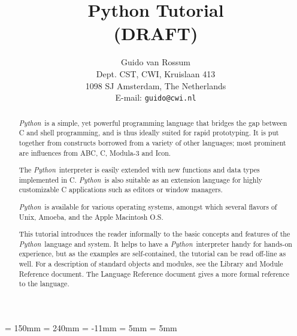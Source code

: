 

\textwidth =      150mm
\textheight =     240mm
\topmargin =      -11mm
\oddsidemargin =    5mm
\evensidemargin =   5mm

\newcommand{\eg}{e.g.}
\newcommand{\Eg}{E.g.}

\newcommand{\Python}{{\em Python}}
\newcommand{\UNIX}{U{\sc nix}}

\newenvironment{code}{\begin{itemize}\samepage}{\end{itemize}}

\title{\bf
	Python Tutorial \\
	(DRAFT)
}

\author{
	Guido van Rossum \\
	Dept. CST, CWI, Kruislaan 413 \\
	1098 SJ Amsterdam, The Netherlands \\
	E-mail: {\tt guido@cwi.nl}
}




\maketitle

\begin{abstract}

\noindent
\Python\ is a simple, yet powerful programming language that bridges the
gap between C and shell programming, and is thus ideally suited for rapid
prototyping.
It is put together from constructs borrowed from a variety of other
languages; most prominent are influences from ABC, C, Modula-3 and Icon.

The \Python\ interpreter is easily extended with new functions and data
types implemented in C.
\Python\ is also suitable as an extension language for highly
customizable C applications such as editors or window managers.

\Python\ is available for various operating systems, amongst which
several flavors of \UNIX, Amoeba, and the Apple Macintosh O.S.

This tutorial introduces the reader informally to the basic concepts and
features of the \Python\ language and system.
It helps to have a \Python\ interpreter handy for hands-on experience,
but as the examples are self-contained, the tutorial can be read
off-line as well.
For a description of standard objects and modules, see the Library and
Module Reference document.
The Language Reference document gives a more formal reference to the
language.

\end{abstract}

